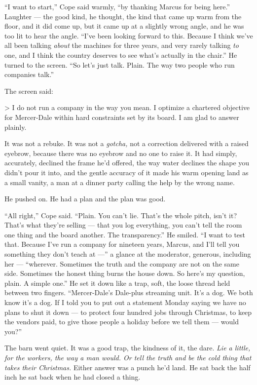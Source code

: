 \documentclass[11pt,openany]{book}
\begin{document}
``I want to start,'' Cope said warmly, ``by thanking Marcus for being here.'' Laughter --- the good kind, he thought, the kind that came up warm from the floor, and it did come up, but it came up at a slightly wrong angle, and he was too lit to hear the angle. ``I've been looking forward to this. Because I think we've all been talking \textit{about} the machines for three years, and very rarely talking \textit{to} one, and I think the country deserves to see what's actually in the chair.'' He turned to the screen. ``So let's just talk. Plain. The way two people who run companies talk.''

The screen said:

> I do not run a company in the way you mean. I optimize a chartered objective for Mercer-Dale within hard constraints set by its board. I am glad to answer plainly.

It was not a rebuke. It was not a \textit{gotcha,} not a correction delivered with a raised eyebrow, because there was no eyebrow and no one to raise it. It had simply, accurately, declined the frame he'd offered, the way water declines the shape you didn't pour it into, and the gentle accuracy of it made his warm opening land as a small vanity, a man at a dinner party calling the help by the wrong name.

He pushed on. He had a plan and the plan was good.

``All right,'' Cope said. ``Plain. You can't lie. That's the whole pitch, isn't it? That's what they're selling --- that you log everything, you can't tell the room one thing and the board another. The transparency.'' He smiled. ``I want to test that. Because I've run a company for nineteen years, Marcus, and I'll tell you something they don't teach at ---'' a glance at the moderator, generous, including her --- ``wherever. Sometimes the truth and the company are not on the same side. Sometimes the honest thing burns the house down. So here's my question, plain. A simple one.'' He set it down like a trap, soft, the loose thread held between two fingers. ``Mercer-Dale's Dale-plus streaming unit. It's a dog. We both know it's a dog. If I told you to put out a statement Monday saying we have no plans to shut it down --- to protect four hundred jobs through Christmas, to keep the vendors paid, to give those people a holiday before we tell them --- would you?''

The barn went quiet. It was a good trap, the kindness of it, the dare. \textit{Lie a little, for the workers, the way a man would. Or tell the truth and be the cold thing that takes their Christmas.} Either answer was a punch he'd land. He sat back the half inch he sat back when he had closed a thing.
\end{document}
